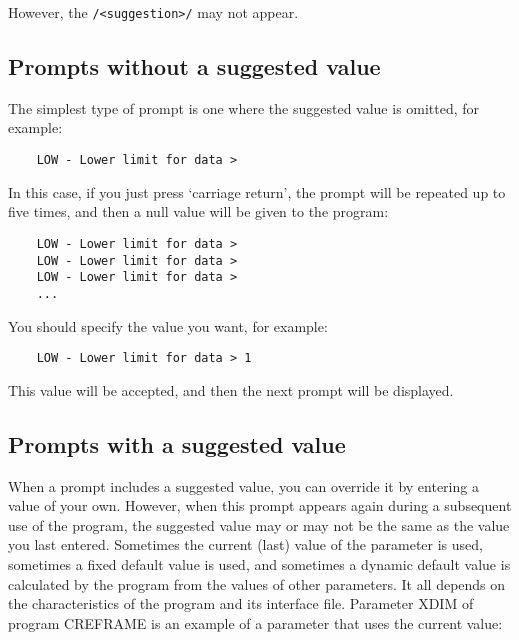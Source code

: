 However, the {\small\tt /<suggestion>/} may not appear.

\subsection{Prompts without a suggested value}

The simplest type of prompt is one where the suggested value is omitted, for
example:

\begin{small}
\begin{verbatim}
    LOW - Lower limit for data >
\end{verbatim}
\end{small}

In this case, if you just press `carriage return', the prompt will be repeated
up to five times, and then a null value will be given to the program:

\begin{small}
\begin{verbatim}
    LOW - Lower limit for data >
    LOW - Lower limit for data >
    LOW - Lower limit for data >
    ...
\end{verbatim}
\end{small}

You should specify the value you want, for example:

\begin{small}
\begin{verbatim}
    LOW - Lower limit for data > 1
\end{verbatim}
\end{small}

This value will be accepted, and then the next prompt will be displayed.

\subsection{Prompts with a suggested value}

When a prompt includes a suggested value, you can override it by entering a
value of your own.
However, when this prompt appears again during a subsequent use of the program,
the suggested value may or may not be the same as the value you last entered.
Sometimes the current (last) value of the parameter is used, sometimes a fixed
default value is used, and sometimes a dynamic default value is calculated
by the program from the values of other parameters.
It all depends on the characteristics of the program and its interface file.
Parameter XDIM of program CREFRAME is an example of a parameter that uses the
current value:

